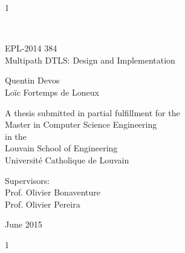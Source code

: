 \documentclass[11pt,a4paper,oldfontcommands]{memoir}
\newcommand\draft{1}
\begin{document}
%
%
\draft
\thispagestyle{empty}

{%
\sffamily
\centering
\Large

~\vspace{\fill}

EPL-2014 384\\
{\huge 
Multipath DTLS: Design and Implementation
}

\vspace{2.5cm}

{\LARGE
Quentin Devos \\
Loïc Fortemps de Loneux
}

\vspace{3.5cm}

A thesis submitted in partial fulfillment for the\\
Master in Computer Science Engineering\\[1em]
in the\\[1em]
Louvain School of Engineering\\
Université Catholique de Louvain

\vspace{3.5cm}

Supervisors: \\
Prof. Olivier Bonaventure\\
Prof. Olivier Pereira

\vspace{\fill}

June 2015

}%

\cleardoublepage

\tableofcontents*
\clearpage

\listoffigures*
\clearpage

\lstlistoflistings*
\clearpage


%
%
%
\fi
%

%
\draft


\appendix

\fi


\end{document}
